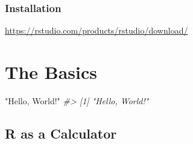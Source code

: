 \documentclass[
]{report}
\newenvironment{Shaded}{\begin{snugshade}}{\end{snugshade}}
\newcommand{\CommentTok}[1]{\textcolor[rgb]{0.56,0.35,0.01}{\textit{#1}}}
\newcommand{\StringTok}[1]{\textcolor[rgb]{0.31,0.60,0.02}{#1}}
\begin{document}
\hypertarget{installation-1}{%
\subsection{Installation}\label{installation-1}}

\url{https://rstudio.com/products/rstudio/download/}

\hypertarget{the-basics}{%
\chapter{The Basics}\label{the-basics}}

\begin{Shaded}
\begin{Highlighting}[]
\StringTok{"Hello, World!"}
\CommentTok{\#\textgreater{} [1] "Hello, World!"}
\end{Highlighting}
\end{Shaded}

\hypertarget{r-as-a-calculator}{%
\section{R as a Calculator}\label{r-as-a-calculator}}
\end{document}
